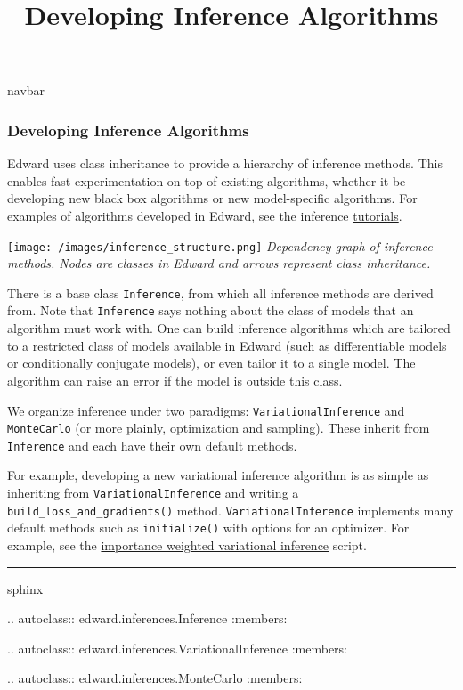 \title{Developing Inference Algorithms}

{{navbar}}

\subsubsection{Developing Inference Algorithms}

Edward uses class inheritance to provide a hierarchy of inference
methods. This enables fast experimentation on top of existing
algorithms, whether it be developing new black box algorithms or
new model-specific algorithms.
For examples of algorithms developed in Edward, see the inference
\href{/tutorials/}{tutorials}.

\texttt{[image: /images/inference\_structure.png]}
{\small\textit{Dependency graph of inference methods.
Nodes are classes in Edward and arrows represent class inheritance.}}

There is a base class \texttt{Inference}, from which all inference
methods are derived from. Note that \texttt{Inference} says nothing
about the class of models that an algorithm must work with. One can
build inference algorithms which are tailored to a restricted class of
models available in Edward (such as differentiable models or
conditionally conjugate models), or even tailor it to a single model.
The algorithm can raise an error if the model is outside this class.

We organize inference under two paradigms:
\texttt{VariationalInference} and \texttt{MonteCarlo} (or more plainly,
optimization and sampling). These inherit from \texttt{Inference} and each
have their own default methods.

For example, developing a new variational inference algorithm is as simple as
inheriting from \texttt{VariationalInference} and writing a
\texttt{build_loss_and_gradients()} method. \texttt{VariationalInference} implements many default methods such
as \texttt{initialize()} with options for an optimizer.
For example, see the
\href{https://github.com/blei-lab/edward/blob/master/examples/tf_iwvi.py}{importance
weighted variational inference} script.

\begin{center}\rule{3in}{0.4pt}\end{center}

{{sphinx

.. autoclass:: edward.inferences.Inference
   :members:

.. autoclass:: edward.inferences.VariationalInference
   :members:

.. autoclass:: edward.inferences.MonteCarlo
   :members:

}}
